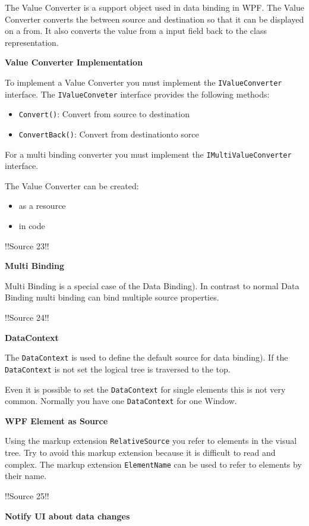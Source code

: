 \documentclass[10pt,twoside,landscape]{article}
\begin{document}
\begin{multicols}{3}
The Value Converter is a support object used in data binding in WPF.
The Value Converter converts the between source and destination so that it can be displayed on a from.
It also converts the value from a input field back to the class representation.

\textbf{Value Converter Implementation}

To implement a Value Converter you must implement the \texttt{IValueConverter} interface.
The \texttt{IValueConveter} interface provides the following methods:
\begin{itemize}
\item \texttt{Convert()}: Convert from source to destination
\item \texttt{ConvertBack()}: Convert from destinationto sorce
\end{itemize}


For a multi binding converter you must implement the \texttt{IMultiValueConverter} interface.


The Value Converter can be created:
\begin{itemize}
\item as a resource
\item in code
\end{itemize}


!!Source 23!!

\textbf{Multi Binding}

Multi Binding is a special case of the Data Binding).
In contrast to normal Data Binding multi binding can bind multiple source properties.

!!Source 24!!

\textbf{DataContext}

The \texttt{DataContext} is used to define the default source for data binding).
If the \texttt{DataContext} is not set the logical tree is traversed to the top.

Even it is possible to set the \texttt{DataContext} for single elements this is not very common.
Normally you have one \texttt{DataContext} for one Window.


\textbf{WPF Element as Source}

Using the markup extension \texttt{RelativeSource} you refer to elements in the visual tree.
Try to avoid this markup extension because it is difficult to read and complex.
The markup extension \texttt{ElementName} can be used to refer to elements by their name.

!!Source 25!!

\textbf{Notify UI about data changes}


\end{multicols}
\end{document}

